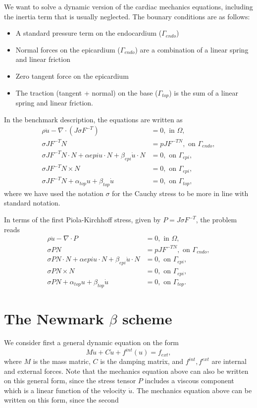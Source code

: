 \documentclass[a4paper,10pt]{article}
\begin{document}
We want to solve a dynamic version of the cardiac mechanics equations, including the
inertia term that is usually neglected. The bounary conditions are as follows:
\begin{itemize}
\item A standard pressure term on the endocardium ($\Gamma_{endo}$)
\item Normal forces on the epicardium ($\Gamma_{endo}$) are a combination of a linear spring
and linear friction
\item Zero tangent force on the epicardium
\item The traction (tangent + normal) on the base ($\Gamma_{top}$) is the sum of
a linear spring and linear friction.
\end{itemize}
In the benchmark description, the equations are written as
\begin{align*}
  \rho \ddot{u} - \nabla\cdot(J\sigma F^{-T}) &= 0, \mbox{ in } \Omega ,\\
  \sigma J F^{-T}N &= pJF^{-TN}, \mbox{ on } \Gamma_{endo}, \\
  \sigma JF^{-T}N\cdot N + \alpha{epi}u\cdot N + \beta_{epi}\dot{u}\cdot N &= 0, \mbox{ on }  \Gamma_{epi}, \\
  \sigma JF^{-T}N\times N &=0, \mbox{ on }  \Gamma_{epi}, \\
  \sigma JF^{-T}N + \alpha_{top}u + \beta_{top}\dot{u} &= 0, \mbox{ on } \Gamma_{top},
\end{align*}
where we have used the notation $\sigma$ for the Cauchy stress to be more in line with standard notation.

In terms of the first Piola-Kirchhoff stress, given by $P = J\sigma F^{-T}$, the problem reads
\begin{align*}
  \rho \ddot{u} - \nabla\cdot P &= 0, \mbox{ in } \Omega ,\\
  \sigma PN &= pJF^{-TN}, \mbox{ on } \Gamma_{endo}, \\
  \sigma PN\cdot N + \alpha{epi}u\cdot N + \beta_{epi}\dot{u}\cdot N &= 0, \mbox{ on }  \Gamma_{epi}, \\
  \sigma PN\times N &=0, \mbox{ on }  \Gamma_{epi}, \\
  \sigma PN + \alpha_{top}u + \beta_{top}\dot{u} &= 0, \mbox{ on } \Gamma_{top}.
\end{align*}

\section{The Newmark $\beta$ scheme}
We consider first a general dynamic equation on the form
\[
M\ddot{u} + C\dot{u} + f^{int}(u) = f_{ext},
\]
where $M$ is the mass matric, $C$ is the damping matrix, and $f^{int}, f^{ext}$
are internal and external forces. Note that the mechanics equation above can also
be written on this general form, since the stress tensor $P$ includes a viscous
component which is a linear function of the velocity $\dot{u}$.
The mechanics equation above can be written on this form, since the second
\end{document}
